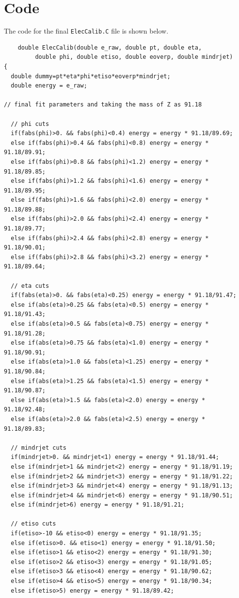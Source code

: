 \documentclass[a4paper]{report}
\numberwithin{equation}{section}
\begin{document}
\chapter{Code} \label{chap:appendix_code}

The code for the final \texttt{ElecCalib.C} file is shown below. 

\begin{tcolorbox}
	\begin{verbatim}
	double ElecCalib(double e_raw, double pt, double eta, 
		 double phi, double etiso, double eoverp, double mindrjet)
{
  double dummy=pt*eta*phi*etiso*eoverp*mindrjet;
  double energy = e_raw;

// final fit parameters and taking the mass of Z as 91.18

  // phi cuts	
  if(fabs(phi)>0. && fabs(phi)<0.4) energy = energy * 91.18/89.69;
  else if(fabs(phi)>0.4 && fabs(phi)<0.8) energy = energy * 91.18/89.91;
  else if(fabs(phi)>0.8 && fabs(phi)<1.2) energy = energy * 91.18/89.85;
  else if(fabs(phi)>1.2 && fabs(phi)<1.6) energy = energy * 91.18/89.95;
  else if(fabs(phi)>1.6 && fabs(phi)<2.0) energy = energy * 91.18/89.88;
  else if(fabs(phi)>2.0 && fabs(phi)<2.4) energy = energy * 91.18/89.77;
  else if(fabs(phi)>2.4 && fabs(phi)<2.8) energy = energy * 91.18/90.01;
  else if(fabs(phi)>2.8 && fabs(phi)<3.2) energy = energy * 91.18/89.64;

  // eta cuts 
  if(fabs(eta)>0. && fabs(eta)<0.25) energy = energy * 91.18/91.47;
  else if(abs(eta)>0.25 && fabs(eta)<0.5) energy = energy * 91.18/91.43;
  else if(abs(eta)>0.5 && fabs(eta)<0.75) energy = energy * 91.18/91.28;
  else if(abs(eta)>0.75 && fabs(eta)<1.0) energy = energy * 91.18/90.91;
  else if(abs(eta)>1.0 && fabs(eta)<1.25) energy = energy * 91.18/90.84;
  else if(abs(eta)>1.25 && fabs(eta)<1.5) energy = energy * 91.18/90.87;
  else if(abs(eta)>1.5 && fabs(eta)<2.0) energy = energy * 91.18/92.48;
  else if(abs(eta)>2.0 && fabs(eta)<2.5) energy = energy * 91.18/89.83;

  // mindrjet cuts 
  if(mindrjet>0. && mindrjet<1) energy = energy * 91.18/91.44;
  else if(mindrjet>1 && mindrjet<2) energy = energy * 91.18/91.19;
  else if(mindrjet>2 && mindrjet<3) energy = energy * 91.18/91.22;
  else if(mindrjet>3 && mindrjet<4) energy = energy * 91.18/91.13;
  else if(mindrjet>4 && mindrjet<6) energy = energy * 91.18/90.51;
  else if(mindrjet>6) energy = energy * 91.18/91.21;

  // etiso cuts 
  if(etiso>-10 && etiso<0) energy = energy * 91.18/91.35;
  else if(etiso>0. && etiso<1) energy = energy * 91.18/91.50;
  else if(etiso>1 && etiso<2) energy = energy * 91.18/91.30;
  else if(etiso>2 && etiso<3) energy = energy * 91.18/91.05;
  else if(etiso>3 && etiso<4) energy = energy * 91.18/90.62;
  else if(etiso>4 && etiso<5) energy = energy * 91.18/90.34;
  else if(etiso>5) energy = energy * 91.18/89.42;


\end{verbatim}
\end{tcolorbox}
\end{document}
